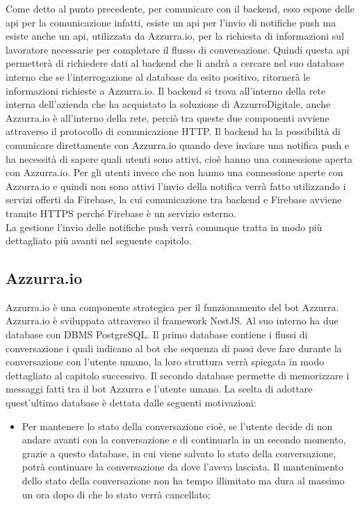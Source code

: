 \begin{trivlist}
	Come detto al punto precedente, per comunicare con il backend, esso espone delle \gls{api} per la comunicazione infatti, esiste un \gls{api} per l'invio di notifiche push ma esiste anche un \gls{api}, utilizzata da Azzurra.io, per la richiesta di informazioni sul lavoratore necessarie per completare il flusso di conversazione. Quindi questa \gls{api} permetterà di richiedere dati al backend che li andrà a cercare nel suo database interno che se l'interrogazione al database da esito positivo, ritornerà le informazioni richieste a Azzurra.io. Il backend si trova all'interno della rete interna dell'azienda che ha acquistato la soluzione di AzzurroDigitale, anche Azzurra.io è all'interno della rete, perciò tra queste due componenti avviene attraverso il protocollo di comunicazione HTTP. Il backend ha la possibilità di comunicare direttamente con Azzurra.io quando deve inviare una notifica push e ha necessità di sapere quali utenti sono attivi, cioè hanno una connessione aperta con Azzurra.io. Per gli utenti invece che non hanno una connessione aperte con Azzurra.io e quindi non sono attivi l'invio della notifica verrà fatto utilizzando i servizi offerti da Firebase, la cui comunicazione tra backend e Firebase avviene tramite HTTPS perché Firebase è un servizio esterno.\\
	La gestione l'invio delle notifiche push verrà comunque tratta in modo più dettagliato più avanti nel seguente capitolo.
	\item \subsection{Azzurra.io}
	Azzurra.io è una componente strategica per il funzionamento del bot Azzurra. Azzurra.io è sviluppata attraverso il framework NestJS. Al suo interno ha due database con DBMS PostgreSQL. Il primo database contiene i flussi di conversazione i quali indicano al bot che sequenza di passi deve fare durante la conversazione con l'utente umano, la loro struttura verrà spiegata in modo dettagliato al capitolo successivo. Il secondo database permette di memorizzare i messaggi fatti tra il bot Azzurra e l'utente umano. La scelta di adottare quest'ultimo database è dettata dalle seguenti motivazioni:
	\begin{itemize}
		\item Per mantenere lo stato della conversazione cioè, se l'utente decide di non andare avanti con la conversazione e di continuarla in un secondo momento, grazie a questo database, in cui viene salvato lo stato della conversazione, potrà continuare la conversazione da dove l'aveva lasciata. Il mantenimento dello stato della conversazione non ha tempo illimitato ma dura al massimo un ora dopo di che lo stato verrà cancellato;

\end{itemize}
\end{trivlist}
